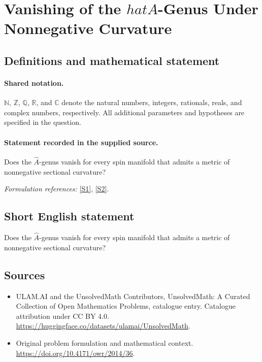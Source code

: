 \documentclass[11pt]{article}
\newcommand{\sref}[2]{\hyperlink{source:#1:#2}{[S#2]}}
\begin{document}
\section{\texorpdfstring{Vanishing of the $hat A$-Genus Under Nonnegative Curvature}{Vanishing of the hat A-Genus Under Nonnegative Curvature}}\label{statement}

\subsection{Definitions and mathematical statement}

\paragraph{Shared notation.}$\mathbb N$, $\mathbb Z$, $\mathbb Q$, $\mathbb R$, and $\mathbb C$ denote the natural numbers, integers, rationals, reals, and complex numbers, respectively. All additional parameters and hypotheses are specified in the question.


\paragraph{Statement recorded in the supplied source.}
Does the $\hat A$-genus vanish for every spin manifold that admits a metric of nonnegative sectional curvature?
\par\smallskip\textit{Formulation references:} \sref{statement}{1}, \sref{statement}{2}.
\subsection{Short English statement}
Does the $\hat A$-genus vanish for every spin manifold that admits a metric of nonnegative sectional curvature?
\subsection{Sources}
\begin{itemize}
\item[\hypertarget{source:statement:1}{S1}] ULAM.AI and the UnsolvedMath Contributors, UnsolvedMath: A Curated Collection of Open Mathematics Problems, catalogue entry. Catalogue attribution under CC BY 4.0.
\url{https://huggingface.co/datasets/ulamai/UnsolvedMath}.
\item[\hypertarget{source:statement:2}{S2}] Original problem formulation and mathematical context.
\url{https://doi.org/10.4171/owr/2014/36}.
\end{itemize}
\label{end:statement}
\end{document}
